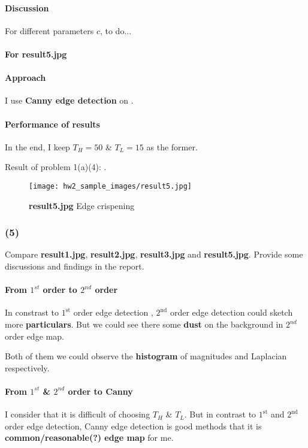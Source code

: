 \paragraph{Discussion}
For different parameters $c$, \alert{to do...}

\paragraph{For \textbf{result5.jpg}}
\paragraph{Approach}
I use \textbf{Canny edge detection} on .

\paragraph{Performance of results}
In the end, I keep $T_{H}=50$ \& $T_{L}=15$ as the former.

Result of problem 1(a)(4): .
\begin{figure}
    \centering
    \texttt{[image: hw2\_sample\_images/result5.jpg]}
    \caption{\textbf{result5.jpg} Edge crispening}
    \label{result5}
\end{figure}

\subsubsection{(5)}
Compare \textbf{result1.jpg}, \textbf{result2.jpg}, \textbf{result3.jpg} and \textbf{result5.jpg}. Provide some discussions and findings in the report.

\paragraph{From $1^{st}$ order to $2^{nd}$ order}
In constrast to $1^{\mbox{st}}$ order edge detection , $2^{\mbox{nd}}$ order edge detection could sketch more \textbf{particulars}.
But we could see there some \textbf{dust} on the background in $2^{nd}$ order edge map.

Both of them we could observe the \textbf{histogram} of magnitudes and Laplacian respectively.

\paragraph{From $1^{st}$ \& $2^{nd}$ order to Canny}
I consider that it is difficult of choosing $T_{H}$ \& $T_{L}$. But in contrast to $1^{\mbox{st}}$ and $2^{\mbox{nd}}$ order edge detection, Canny edge detection is good methods that it is \textbf{common/reasonable(?) edge map} for me.

